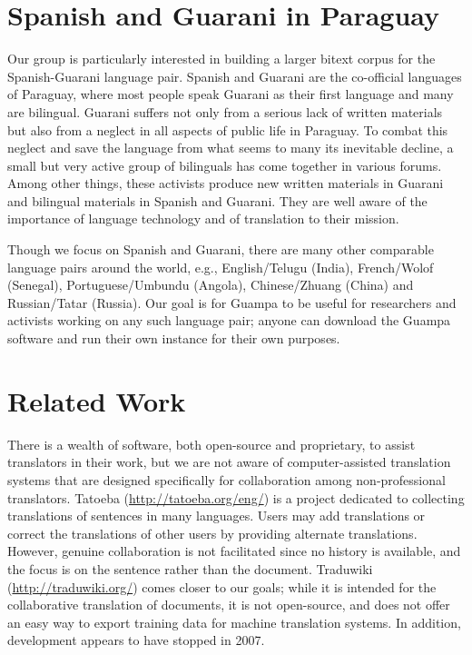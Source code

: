\documentclass[10pt, a4paper]{article}
\begin{document}
\section{Spanish and Guarani in Paraguay}
Our group is particularly interested in building a larger bitext corpus for the
Spanish-Guarani language pair. Spanish and Guarani are the co-official
languages of Paraguay, where most people speak Guarani as their first language
and many are bilingual. Guarani suffers not only from a serious lack of
written materials but also from a neglect in all aspects of public life in
Paraguay. To combat this neglect and save the language from what seems to many
its inevitable decline, a small but very active group of bilinguals has come
together in various forums. Among other things, these activists produce new
written materials in Guarani and bilingual materials in Spanish and Guarani.
They are well aware of the importance of language technology and of translation
to their mission.

Though we focus on Spanish and Guarani, there are many other comparable
language pairs around the world, e.g., English/Telugu (India), French/Wolof
(Senegal), Portuguese/Umbundu (Angola), Chinese/Zhuang (China) and
Russian/Tatar (Russia). Our goal is for Guampa to be useful for researchers and
activists working on any such language pair; anyone can download the Guampa
software and run their own instance for their own purposes.

\section{Related Work}
There is a wealth of software, both open-source and proprietary, to assist
translators in their work, but we are not aware of computer-assisted
translation systems that are designed specifically for collaboration among
non-professional translators. Tatoeba (\url{http://tatoeba.org/eng/}) is a
project dedicated to collecting translations of sentences in many languages.
Users may add translations or correct the translations of other users by
providing alternate translations. However, genuine collaboration is not
facilitated since no history is available, and the focus is on the sentence
rather than the document. Traduwiki (\url{http://traduwiki.org/}) comes closer
to our goals; while it is intended for the collaborative translation of
documents, it is not open-source, and does not offer an easy way to export
training data for machine translation systems. In addition, development appears
to have stopped in 2007.
\end{document}
